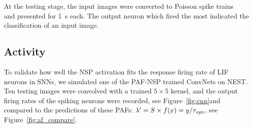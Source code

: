 	At the testing stage, the input images were converted to Poisson spike trains~\citep{liu2016bench} and presented for 1~s each.
	The output neuron which fired the most indicated the classification of an input image.
%	
%	

	
	\subsection{\DIFdelbegin {}\DIFdelend \DIFaddbegin {}\DIFaddend Activity}
	\DIFaddbegin \label{subsec:compareAF}
\DIFaddend %
	To validate how well the NSP activation fits \DIFdelbegin {}\DIFdelend the response firing rate of LIF neurons in SNNs, we simulated one of the PAF-NSP trained ConvNets on NEST.
	Ten testing images were convolved with a trained $5\times5$ kernel, and the output firing rates of the spiking neurons were recorded, see Figure~\ref{fig:cnn}\DIFaddbegin \DIFadd{, }\DIFaddend and compared to the predictions of these PAFs: $\lambda' = S \times f(x) = y/\tau_{\textit{\textrm{syn}}}$, see Figure~\ref{fig:af_compare}.

